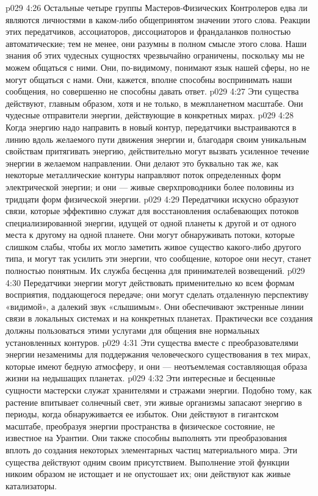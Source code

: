 \vs p029 4:26 \pc Остальные четыре группы Мастеров\hyp{}Физических Контролеров едва ли являются личностями в каком\hyp{}либо общепринятом значении этого слова. Реакции этих передатчиков, ассоциаторов, диссоциаторов и франдаланков полностью автоматические; тем не менее, они разумны в полном смысле этого слова. Наши знания об этих чудесных сущностях чрезвычайно ограничены, поскольку мы не можем общаться с ними. Они, по\hyp{}видимому, понимают язык нашей сферы, но не могут общаться с нами. Они, кажется, вполне способны воспринимать наши сообщения, но совершенно не способны давать ответ.
\vs p029 4:27 \pc {}\bibnobreakspace {} Эти существа действуют, главным образом, хотя и не только, в межпланетном масштабе. Они чудесные отправители энергии, действующие в конкретных мирах.
\vs p029 4:28 Когда энергию надо направить в новый контур, передатчики выстраиваются в линию вдоль желаемого пути движения энергии и, благодаря своим уникальным свойствам притягивать энергию, действительно могут вызвать усиленное течение энергии в желаемом направлении. Они делают это буквально так же, как некоторые металлические контуры направляют поток определенных форм электрической энергии; и они --- живые сверхпроводники более половины из тридцати форм физической энергии.
\vs p029 4:29 Передатчики искусно образуют связи, которые эффективно служат для восстановления ослабевающих потоков специализированной энергии, идущей от одной планеты к другой и от одного места к другому на одной планете. Они могут обнаруживать потоки, которые слишком слабы, чтобы их могло заметить живое существо какого\hyp{}либо другого типа, и могут так усилить эти энергии, что сообщение, которое они несут, станет полностью понятным. Их служба бесценна для принимателей возвещений.
\vs p029 4:30 Передатчики энергии могут действовать применительно ко всем формам восприятия, поддающегося передаче; они могут сделать отдаленную перспективу «видимой», а далекий звук «слышимым». Они обеспечивают экстренные линии связи в локальных системах и на конкретных планетах. Практически все создания должны пользоваться этими услугами для общения вне нормальных установленных контуров.
\vs p029 4:31 Эти существа вместе с преобразователями энергии незаменимы для поддержания человеческого существования в тех мирах, которые имеют бедную атмосферу, и они --- неотъемлемая составляющая образа жизни на недышащих планетах.
\vs p029 4:32 \pc {}\bibnobreakspace {} Эти интересные и бесценные сущности мастерски служат хранителями и стражами энергии. Подобно тому, как растение впитывает солнечный свет, эти живые организмы запасают энергию в периоды, когда обнаруживается ее избыток. Они действуют в гигантском масштабе, преобразуя энергии пространства в физическое состояние, не известное на Урантии. Они также способны выполнять эти преобразования вплоть до создания некоторых элементарных частиц материального мира. Эти существа действуют одним своим присутствием. Выполнение этой функции никоим образом не истощает и не опустошает их; они действуют как живые катализаторы.
